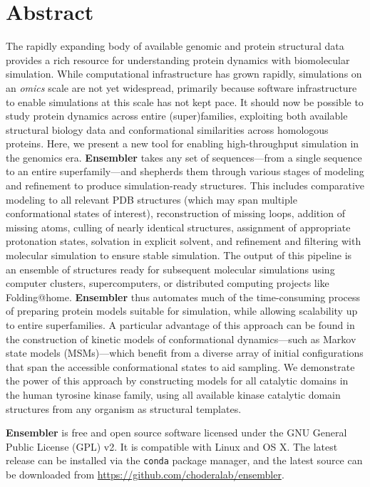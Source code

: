 \documentclass[10pt,letterpaper]{article}
\begin{document}
\section*{Abstract}
The rapidly expanding body of available genomic and protein structural data provides a rich resource for understanding protein dynamics with biomolecular simulation. 
While computational infrastructure has grown rapidly, simulations on an \emph{omics} scale are not yet widespread, primarily because software infrastructure to enable simulations at this scale has not kept pace. 
It should now be possible to study protein dynamics across entire (super)families, exploiting both available structural biology data and conformational similarities across homologous proteins.
Here, we present a new tool for enabling high-throughput simulation in the genomics era.
{\bf Ensembler} takes any set of sequences---from a single sequence to an entire superfamily---and shepherds them through various stages of modeling and refinement to produce simulation-ready structures.
This includes comparative modeling to all relevant PDB structures (which may span multiple conformational states of interest), reconstruction of missing loops, addition of missing atoms, culling of nearly identical structures, assignment of appropriate protonation states, solvation in explicit solvent, and refinement and filtering with molecular simulation to ensure stable simulation. 
The output of this pipeline is an ensemble of structures ready for subsequent molecular simulations using computer clusters, supercomputers, or distributed computing projects like Folding@home.
{\bf Ensembler} thus automates much of the time-consuming process of preparing protein models suitable for simulation, while allowing scalability up to entire superfamilies.
A particular advantage of this approach can be found in the construction of kinetic models of conformational dynamics---such as Markov state models (MSMs)---which benefit from a diverse array of initial configurations that span the accessible conformational states to aid sampling.
We demonstrate the power of this approach by constructing models for all catalytic domains in the human tyrosine kinase family, using all available kinase catalytic domain structures from any organism as structural templates.

{\bf Ensembler} is free and open source software licensed under the GNU General Public License (GPL) v2. 
It is compatible with Linux and OS X.
The latest release can be installed via the {\tt conda} package manager, and the latest source can be downloaded from \url{https://github.com/choderalab/ensembler}.
\end{document}
